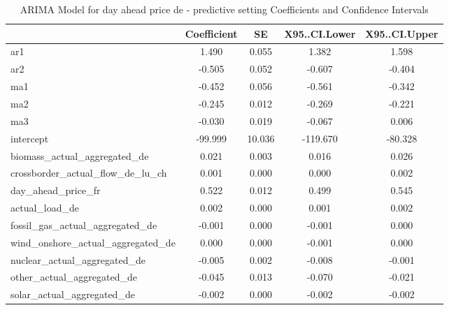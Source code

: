 \begin{table}
\caption{ARIMA Model for day ahead price de - predictive setting Coefficients and Confidence Intervals}
\centering
\begin{tabular}[t]{l|c|c|c|c}
\hline
  & Coefficient & SE & X95..CI.Lower & X95..CI.Upper\\
\hline
ar1 & 1.490 & 0.055 & 1.382 & 1.598\\
\hline
ar2 & -0.505 & 0.052 & -0.607 & -0.404\\
\hline
ma1 & -0.452 & 0.056 & -0.561 & -0.342\\
\hline
ma2 & -0.245 & 0.012 & -0.269 & -0.221\\
\hline
ma3 & -0.030 & 0.019 & -0.067 & 0.006\\
\hline
intercept & -99.999 & 10.036 & -119.670 & -80.328\\
\hline
biomass\_actual\_aggregated\_de & 0.021 & 0.003 & 0.016 & 0.026\\
\hline
crossborder\_actual\_flow\_de\_lu\_ch & 0.001 & 0.000 & 0.000 & 0.002\\
\hline
day\_ahead\_price\_fr & 0.522 & 0.012 & 0.499 & 0.545\\
\hline
actual\_load\_de & 0.002 & 0.000 & 0.001 & 0.002\\
\hline
fossil\_gas\_actual\_aggregated\_de & -0.001 & 0.000 & -0.001 & 0.000\\
\hline
wind\_onshore\_actual\_aggregated\_de & 0.000 & 0.000 & -0.001 & 0.000\\
\hline
nuclear\_actual\_aggregated\_de & -0.005 & 0.002 & -0.008 & -0.001\\
\hline
other\_actual\_aggregated\_de & -0.045 & 0.013 & -0.070 & -0.021\\
\hline
solar\_actual\_aggregated\_de & -0.002 & 0.000 & -0.002 & -0.002\\
\hline
\end{tabular}
\end{table}\begin{table}


\end{table}
